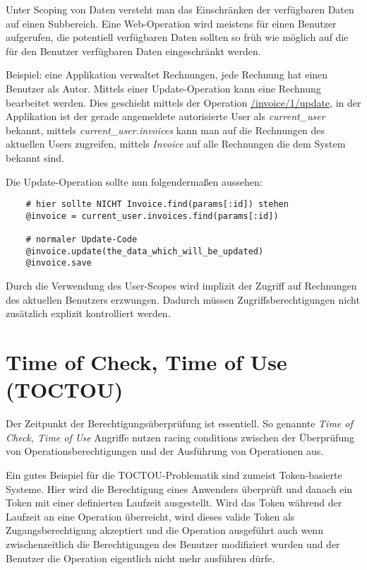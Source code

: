 Unter Scoping von Daten versteht man das Einschränken der verfügbaren Daten auf einen Subbereich. Eine Web-Operation wird meistens für einen Benutzer aufgerufen, die potentiell verfügbaren Daten sollten so früh wie möglich auf die für den Benutzer verfügbaren Daten eingeschränkt werden.

Beispiel: eine Applikation verwaltet Rechnungen, jede Rechnung hat einen Benutzer als Autor. Mittels einer Update-Operation kann eine Rechnung bearbeitet werden. Dies geschieht mittels der Operation \url{/invoice/1/update}, in der Applikation ist der gerade angemeldete autorisierte User als \textit{current\_user} bekannt, mittels \textit{current\_user.invoices} kann man auf die Rechnungen des aktuellen Users zugreifen, mittels \textit{Invoice} auf alle Rechnungen die dem System bekannt sind.

Die Update-Operation sollte nun folgendermaßen aussehen:

\begin{verbatim}
	# hier sollte NICHT Invoice.find(params[:id]) stehen
	@invoice = current_user.invoices.find(params[:id])

	# normaler Update-Code
	@invoice.update(the_data_which_will_be_updated)
	@invoice.save
\end{verbatim}

Durch die Verwendung des User-Scopes wird implizit der Zugriff auf Rechnungen des aktuellen Benutzers erzwungen. Dadurch müssen Zugriffsberechtigungen nicht zusätzlich explizit kontrolliert werden.

\section{Time of Check, Time of Use (TOCTOU)}

Der Zeitpunkt der Berechtigungsüberprüfung ist essentiell. So genannte \textit{Time of Check, Time of Use} Angriffe nutzen racing conditions zwischen der Überprüfung von Operationsberechtigungen und der Ausführung von Operationen aus.

Ein gutes Beispiel für die TOCTOU-Problematik sind zumeist Token-basierte Systeme. Hier wird die Berechtigung eines Anwenders überprüft und danach ein Token mit einer definierten Laufzeit ausgestellt. Wird das Token während der Laufzeit an eine Operation überreicht, wird dieses valide Token als Zugangsberechtigung akzeptiert und die Operation ausgeführt auch wenn zwischenzeitlich die Berechtigungen des Benutzer modifiziert wurden und der Benutzer die Operation eigentlich nicht mehr ausführen dürfe.

